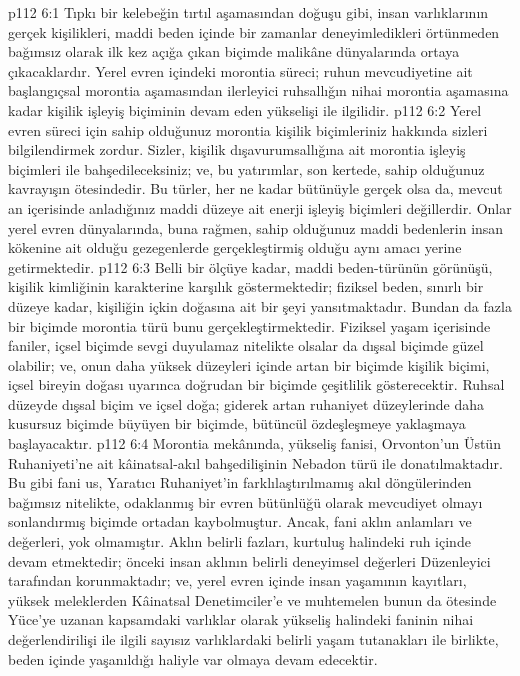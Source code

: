 \vs p112 6:1 Tıpkı bir kelebeğin tırtıl aşamasından doğuşu gibi, insan varlıklarının gerçek kişilikleri, maddi beden içinde bir zamanlar deneyimledikleri örtünmeden bağımsız olarak ilk kez açığa çıkan biçimde malikâne dünyalarında ortaya çıkacaklardır. Yerel evren içindeki morontia süreci; ruhun mevcudiyetine ait başlangıçsal morontia aşamasından ilerleyici ruhsallığın nihai morontia aşamasına kadar kişilik işleyiş biçiminin devam eden yükselişi ile ilgilidir.
\vs p112 6:2 Yerel evren süreci için sahip olduğunuz morontia kişilik biçimleriniz hakkında sizleri bilgilendirmek zordur. Sizler, kişilik dışavurumsallığına ait morontia işleyiş biçimleri ile bahşedileceksiniz; ve, bu yatırımlar, son kertede, sahip olduğunuz kavrayışın ötesindedir. Bu türler, her ne kadar bütünüyle gerçek olsa da, mevcut an içerisinde anladığınız maddi düzeye ait enerji işleyiş biçimleri değillerdir. Onlar yerel evren dünyalarında, buna rağmen, sahip olduğunuz maddi bedenlerin insan kökenine ait olduğu gezegenlerde gerçekleştirmiş olduğu aynı amacı yerine getirmektedir.
\vs p112 6:3 Belli bir ölçüye kadar, maddi beden\hyp{}türünün görünüşü, kişilik kimliğinin karakterine karşılık göstermektedir; fiziksel beden, sınırlı bir düzeye kadar, kişiliğin içkin doğasına ait bir şeyi yansıtmaktadır. Bundan da fazla bir biçimde morontia türü bunu gerçekleştirmektedir. Fiziksel yaşam içerisinde faniler, içsel biçimde sevgi duyulamaz nitelikte olsalar da dışsal biçimde güzel olabilir; ve, onun daha yüksek düzeyleri içinde artan bir biçimde kişilik biçimi, içsel bireyin doğası uyarınca doğrudan bir biçimde çeşitlilik gösterecektir. Ruhsal düzeyde dışsal biçim ve içsel doğa; giderek artan ruhaniyet düzeylerinde daha kusursuz biçimde büyüyen bir biçimde, bütüncül özdeşleşmeye yaklaşmaya başlayacaktır.
\vs p112 6:4 Morontia mekânında, yükseliş fanisi, Orvonton’un Üstün Ruhaniyeti’ne ait kâinatsal\hyp{}akıl bahşedilişinin Nebadon türü ile donatılmaktadır. Bu gibi fani us, Yaratıcı Ruhaniyet’in farklılaştırılmamış akıl döngülerinden bağımsız nitelikte, odaklanmış bir evren bütünlüğü olarak mevcudiyet olmayı sonlandırmış biçimde ortadan kaybolmuştur. Ancak, fani aklın anlamları ve değerleri, yok olmamıştır. Aklın belirli fazları, kurtuluş halindeki ruh içinde devam etmektedir; önceki insan aklının belirli deneyimsel değerleri Düzenleyici tarafından korunmaktadır; ve, yerel evren içinde insan yaşamının kayıtları, yüksek meleklerden Kâinatsal Denetimciler’e ve muhtemelen bunun da ötesinde Yüce’ye uzanan kapsamdaki varlıklar olarak yükseliş halindeki faninin nihai değerlendirilişi ile ilgili sayısız varlıklardaki belirli yaşam tutanakları ile birlikte, beden içinde yaşanıldığı haliyle var olmaya devam edecektir.
